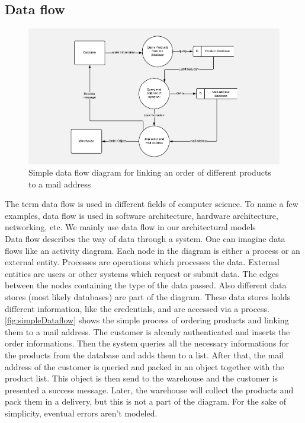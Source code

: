 \subsection{Data flow}
\begin{figure}[!htb]
\includegraphics[scale=1]{logos/Simple_Dataflow.pdf}
\caption{Simple data flow diagram for linking an order of different products to a mail address}
\label{fig:simpleDataflow}
\end{figure}
The term data flow is used in different fields of computer science. To name a few examples, data flow is used in software architecture, hardware architecture, networking, etc. We mainly use data flow in our architectural models \\
Data flow describes the way of data through a system. One can imagine data flows like an activity diagram. Each node in the diagram is either a process or an external entity. Processes are operations which processes the data. External entities are users or other systems which request or submit data. The edges between the nodes containing the type of the data passed. Also different data stores (most likely databases) are part of the diagram. These data stores holds different information, like the credentials, and are accessed via a process.\\
\autoref{fig:simpleDataflow} shows the simple process of ordering products and linking them to a mail address. The customer is already authenticated and inserts the order informations. Then the system queries all the necessary informations for the products from the database and adds them to a list. After that, the mail address of the customer is queried and packed in an object together with the product list. This object is then send to the warehouse and the customer is presented a success message. Later, the warehouse will collect the products and pack them in a delivery, but this is not a part of the diagram. For the sake of simplicity, eventual errors aren't modeled. 

